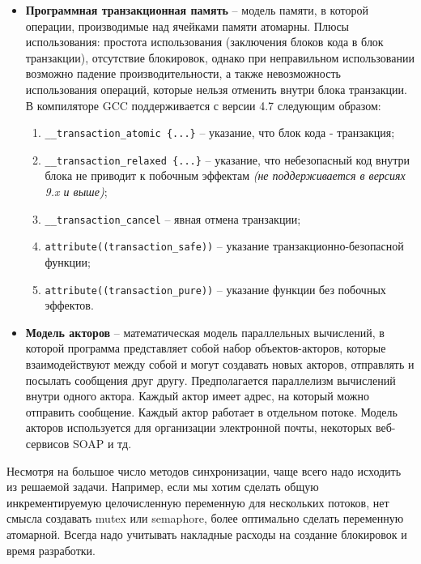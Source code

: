 \begin{itemize}
    \item\textbf{Программная транзакционная память} -- модель памяти, в которой операции, производимые над ячейками памяти атомарны.
    Плюсы использования: простота использования (заключения блоков кода в блок транзакции), отсутствие блокировок, однако при неправильном использовании возможно падение производительности, а также невозможность использования операций, которые нельзя отменить внутри блока транзакции.
    В компиляторе GCC поддерживается с версии 4.7 следующим образом:
    \begin{enumerate}
        \item\texttt{\_\_transaction\_atomic \{...\}} -- указание, что блок кода - транзакция;
        \item\texttt{\_\_transaction\_relaxed \{...\}} -- указание, что небезопасный код внутри блока не приводит к побочным эффектам \textit{(не поддерживается в версиях 9.x и выше)};
        \item\texttt{\_\_transaction\_cancel} -- явная отмена транзакции;
        \item\texttt{attribute((transaction\_safe))} -- указание тран\-зак\-ци\-он\-но-бе\-зо\-пас\-ной функции;
        \item\texttt{attribute((transaction\_pure))} -- указание функции без побочных эффектов.
    \end{enumerate}

    \item\textbf{Модель акторов} -- математическая модель параллельных вычислений, в которой программа представляет собой набор объектов-акторов, которые взаимодействуют между собой и могут создавать новых акторов, отправлять и посылать сообщения друг другу.
    Предполагается параллелизм вычислений внутри одного актора.
    Каждый актор имеет адрес, на который можно отправить сообщение.
    Каждый актор работает в отдельном потоке.
    Модель акторов используется для организации электронной почты, некоторых веб-сервисов SOAP и тд.
\end{itemize}

Несмотря на большое число методов синхронизации, чаще всего надо исходить из решаемой задачи.
Например, если мы хотим сделать общую инкрементируемую целочисленную переменную для нескольких потоков, нет смысла создавать mutex или semaphore, более оптимально сделать переменную атомарной.
Всегда надо учитывать накладные расходы на создание блокировок и время разработки.
